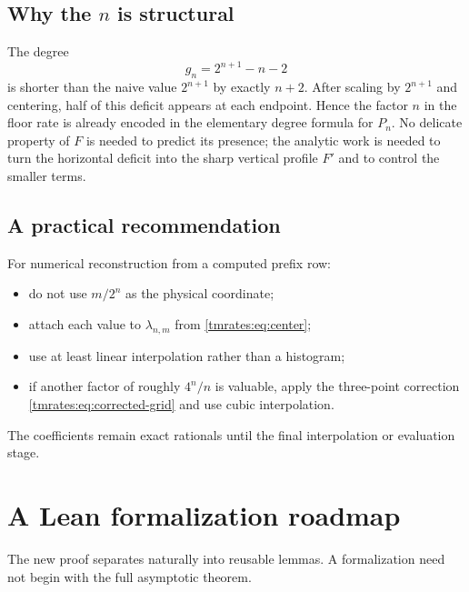 \documentclass[11pt,oneside]{article}
\theoremstyle{definition}
\theoremstyle{remark}
\begin{document}
\subsection{Why the \texorpdfstring{$n$}{n} is structural}

The degree
\begin{equation}
 g_n=2^{n+1}-n-2
\end{equation}
is shorter than the naive value $2^{n+1}$ by exactly $n+2$.  After scaling by
$2^{n+1}$ and centering, half of this deficit appears at each endpoint.  Hence the factor $n$
in the floor rate is already encoded in the elementary degree formula for $P_n$.  No delicate
property of $F$ is needed to predict its presence; the analytic work is needed to turn the
horizontal deficit into the sharp vertical profile $F'$ and to control the smaller terms.

\subsection{A practical recommendation}

For numerical reconstruction from a computed prefix row:
\begin{itemize}
\item do not use $m/2^n$ as the physical coordinate;
\item attach each value to $\lambda_{n,m}$ from \eqref{tmrates:eq:center};
\item use at least linear interpolation rather than a histogram;
\item if another factor of roughly $4^n/n$ is valuable, apply the three-point correction
      \eqref{tmrates:eq:corrected-grid} and use cubic interpolation.
\end{itemize}
The coefficients remain exact rationals until the final interpolation or evaluation stage.

\section{A Lean formalization roadmap}
\label{tmrates:sec:lean-roadmap}

The new proof separates naturally into reusable lemmas.  A formalization need not begin with
the full asymptotic theorem.
\end{document}
